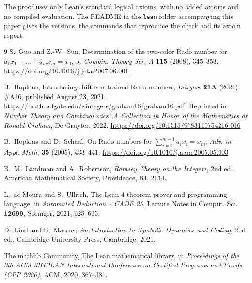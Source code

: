 \documentclass[11pt]{article}
\theoremstyle{remark}
\begin{document}
The proof uses only Lean's standard logical axioms, with no added
axioms and no compiled evaluation. The README in the \texttt{lean} folder
accompanying this paper gives the versions, the commands that reproduce
the check and its axiom report.

\begin{thebibliography}{9}
S.~Guo and Z.-W.~Sun, Determination of the two-color Rado number for
$a_1x_1+\dots+a_mx_m=x_0$, \emph{J. Combin. Theory Ser. A} \textbf{115}
(2008), 345--353. \url{https://doi.org/10.1016/j.jcta.2007.06.001}

B.~Hopkins, Introducing shift-constrained Rado numbers,
\emph{Integers} \textbf{21A} (2021), \#A16, published August 23, 2021.
\url{https://math.colgate.edu/~integers/graham16/graham16.pdf}.
Reprinted in \emph{Number Theory and Combinatorics: A Collection in
Honor of the Mathematics of Ronald Graham}, De Gruyter, 2022.
\url{https://doi.org/10.1515/9783110754216-016}

B.~Hopkins and D.~Schaal, On Rado numbers for
$\sum_{i=1}^{m-1}a_ix_i=x_m$, \emph{Adv. in Appl. Math.} \textbf{35}
(2005), 433--441. \url{https://doi.org/10.1016/j.aam.2005.05.003}

B.~M.~Landman and A.~Robertson, \emph{Ramsey Theory on the Integers},
2nd ed., American Mathematical Society, Providence, RI, 2014.

L.~de Moura and S.~Ullrich, The Lean 4 theorem prover and programming
language, in \emph{Automated Deduction -- CADE 28}, Lecture Notes in
Comput. Sci. \textbf{12699}, Springer, 2021, 625--635.

D.~Lind and B.~Marcus, \emph{An Introduction to Symbolic Dynamics and
Coding}, 2nd ed., Cambridge University Press, Cambridge, 2021.

The mathlib Community, The Lean mathematical library, in
\emph{Proceedings of the 9th ACM SIGPLAN International Conference on
Certified Programs and Proofs (CPP 2020)}, ACM, 2020, 367--381.
\end{thebibliography}
\end{document}
